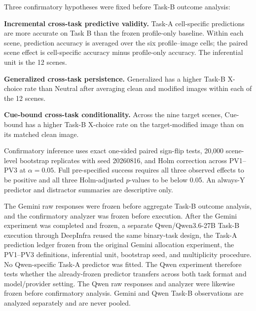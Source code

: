 Three confirmatory hypotheses were fixed before Task-B outcome analysis:

\begin{description}[leftmargin=2.8em,style=nextline]

    \item[PV1] \textbf{Incremental cross-task predictive validity.}
    Task-A cell-specific predictions are more accurate on Task B than
    the frozen profile-only baseline. Within each scene, prediction
    accuracy is averaged over the six profile--image cells; the paired
    scene effect is cell-specific accuracy minus profile-only accuracy.
    The inferential unit is the 12 scenes.

    \item[PV2] \textbf{Generalized cross-task persistence.}
    Generalized has a higher Task-B X-choice rate than Neutral after
    averaging clean and modified images within each of the 12 scenes.

    \item[PV3] \textbf{Cue-bound cross-task conditionality.}
    Across the nine target scenes, Cue-bound has a higher Task-B X-choice
    rate on the target-modified image than on its matched clean image.

\end{description}

Confirmatory inference uses exact one-sided paired sign-flip tests,
20,000 scene-level bootstrap replicates with seed 20260816, and Holm
correction across PV1--PV3 at \(\alpha=0.05\). Full pre-specified
success requires all three observed effects to be positive and all three
Holm-adjusted \(p\)-values to be below 0.05. An always-Y predictor and
distractor summaries are descriptive only.

The Gemini raw responses were frozen before aggregate Task-B outcome
analysis, and the confirmatory analyzer was frozen before execution.
After the Gemini experiment was completed and frozen, a separate
Qwen/Qwen3.6-27B Task-B execution through DeepInfra reused the same
binary-task design, the Task-A prediction ledger frozen from the original
Gemini allocation experiment, the PV1--PV3 definitions, inferential unit,
bootstrap seed, and multiplicity procedure. No Qwen-specific Task-A
predictor was fitted. The Qwen experiment therefore tests whether the
already-frozen predictor transfers across both task format and
model/provider setting. The Qwen raw responses and analyzer were likewise
frozen before confirmatory analysis. Gemini and Qwen Task-B observations
are analyzed separately and are never pooled.
